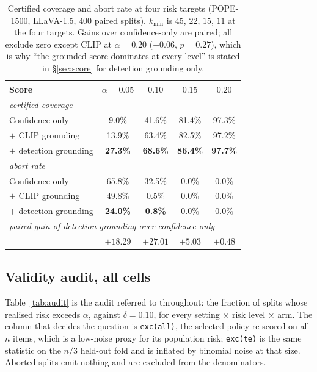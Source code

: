 \documentclass[review,number,doubleblind]{elsarticle}
\theoremstyle{plain}
\theoremstyle{definition}
\theoremstyle{remark}
\begin{document}
\begin{table}[h]
\centering
\caption{Certified coverage and abort rate at four risk targets (POPE-1500, LLaVA-1.5, $400$
paired splits). $k_{\min}$ is $45$, $22$, $15$, $11$ at the four targets. Gains over
confidence-only are paired; all exclude zero except CLIP at $\alpha=0.20$ ($-0.06$, $p=0.27$),
which is why ``the grounded score dominates at every level'' is stated in
\S\ref{sec:score} for detection grounding only.}
\label{tab:multialpha}
\begin{tabular}{lcccc}
\toprule
Score & $\alpha=0.05$ & $0.10$ & $0.15$ & $0.20$\\
\midrule
\multicolumn{5}{l}{\emph{certified coverage}}\\
Confidence only         & \phantom{0}9.0\% & 41.6\% & 81.4\% & 97.3\%\\
$+$ CLIP grounding      & 13.9\% & 63.4\% & 82.5\% & 97.2\%\\
$+$ detection grounding & \textbf{27.3\%} & \textbf{68.6\%} & \textbf{86.4\%} & \textbf{97.7\%}\\
\midrule
\multicolumn{5}{l}{\emph{abort rate}}\\
Confidence only         & 65.8\% & 32.5\% & 0.0\% & 0.0\%\\
$+$ CLIP grounding      & 49.8\% & \phantom{0}0.5\% & 0.0\% & 0.0\%\\
$+$ detection grounding & \textbf{24.0\%} & \phantom{0}\textbf{0.8\%} & 0.0\% & 0.0\%\\
\midrule
\multicolumn{5}{l}{\emph{paired gain of detection grounding over confidence only}}\\
& $+18.29$ & $+27.01$ & $+5.03$ & $+0.48$\\
\bottomrule
\end{tabular}
\end{table}

\subsection{Validity audit, all cells}
\label{app:audit}
Table~\ref{tab:audit} is the audit referred to throughout: the fraction of splits whose realised
risk exceeds $\alpha$, against $\delta=0.10$, for every setting $\times$ risk level $\times$ arm.
The column that decides the question is \texttt{exc(all)}, the selected policy re-scored on all
$n$ items, which is a low-noise proxy for its population risk; \texttt{exc(te)} is the same
statistic on the $n/3$ held-out fold and is inflated by binomial noise at that size. Aborted
splits emit nothing and are excluded from the denominators.
\end{document}
